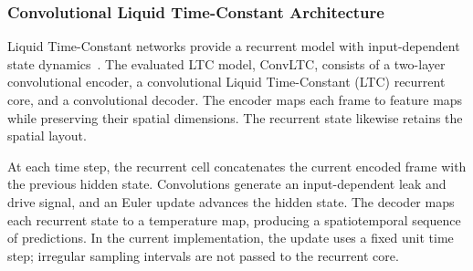 \subsubsection{Convolutional Liquid Time-Constant Architecture}
\label{sec:conv_ltc}
Liquid Time-Constant networks provide a recurrent model with input-dependent
state dynamics~\cite{lechner2020neural}. The evaluated LTC model, ConvLTC,
consists of a two-layer convolutional
encoder, a convolutional Liquid Time-Constant (LTC) recurrent core, and a
convolutional decoder. The encoder maps each frame to feature maps while
preserving their spatial dimensions. The recurrent state likewise retains
the spatial layout.

At each time step, the recurrent cell concatenates the current encoded frame
with the previous hidden state. Convolutions generate an input-dependent
leak and drive signal, and an Euler update advances the hidden state. The
decoder maps each recurrent state to a temperature map, producing a
spatiotemporal sequence of predictions. In the current implementation, the
update uses a fixed unit time step; irregular sampling intervals are not
passed to the recurrent core.
